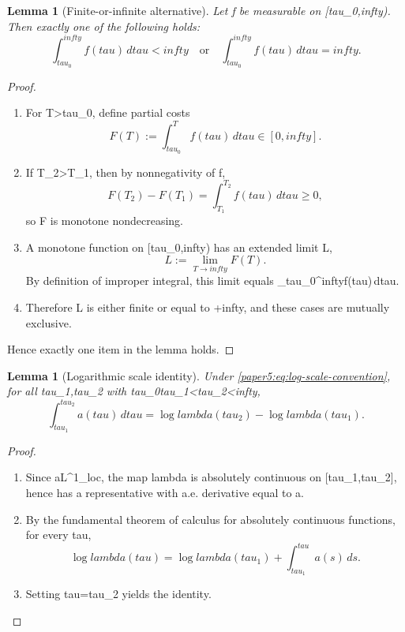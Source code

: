 \documentclass[11pt]{amsart}
\def\({}%
\def\){}%
\def\mathrm#1{#1}%
\def\tau{tau}%
\def\lambda{lambda}%
\def\infty{infty}%
\theoremstyle{plain}
\newtheorem{lemma}[theorem]{Lemma}
\theoremstyle{definition}
\theoremstyle{remark}
\begin{document}
\begin{lemma}[Finite-or-infinite alternative]\label{paper5:lem:finite-infinite}
Let \(f\) be measurable on \([\tau_0,\infty)\). Then exactly one of the following holds:
\[
  \int_{\tau_0}^{\infty}f(\tau)
  \,d\tau<\infty
  \quad\text{or}\quad
  \int_{\tau_0}^{\infty}f(\tau)
  \,d\tau=\infty.
\]
\end{lemma}

\begin{proof}
\begin{enumerate}[label=(\arabic*)]
  \item For \(T>\tau_0\), define partial costs
  \[
    F(T):=\int_{\tau_0}^{T}f(\tau)
    \,d\tau\in[0,\infty].
  \]

  \item If \(T_2>T_1\), then by nonnegativity of \(f\),
  \[
    F(T_2)-F(T_1)=\int_{T_1}^{T_2}f(\tau)
    \,d\tau\ge0,
  \]
  so \(F\) is monotone nondecreasing.

  \item A monotone function on \([\tau_0,\infty)\) has an extended limit
  \(L\in[0,\infty]\),
  \[
    L:=\lim_{T\to\infty}F(T).
  \]
  By definition of improper integral, this limit equals
  \(\int_{\tau_0}^{\infty}f(\tau)\,d\tau\).

  \item Therefore \(L\) is either finite or equal to \(+\infty\), and these
  cases are mutually exclusive.
\end{enumerate}
Hence exactly one item in the lemma holds.
\end{proof}

\begin{lemma}[Logarithmic scale identity]\label{paper5:lem:log-scale}
Under \eqref{paper5:eq:log-scale-convention}, for all \(\tau_1,\tau_2\) with
\(\tau_0\le\tau_1<\tau_2<\infty\),
\[
  \int_{\tau_1}^{\tau_2}a(\tau)
  \,d\tau
  =\log\lambda(\tau_2)-\log\lambda(\tau_1).
\]
\end{lemma}

\begin{proof}
\begin{enumerate}[label=(\arabic*)]
  \item Since \(a\in L^1_{\mathrm{loc}}\), the map
  \(\log\lambda\) is absolutely continuous on \([\tau_1,\tau_2]\), hence has a
  representative with a.e. derivative equal to \(a\).

  \item By the fundamental theorem of calculus for absolutely continuous functions,
  for every \(\tau\in[\tau_1,\tau_2]\),
  \[
    \log\lambda(\tau)=\log\lambda(\tau_1)+\int_{\tau_1}^{\tau}a(s)
    \,ds.
  \]

  \item Setting \(\tau=\tau_2\) yields the identity.
\end{enumerate}
\end{proof}
\end{document}
